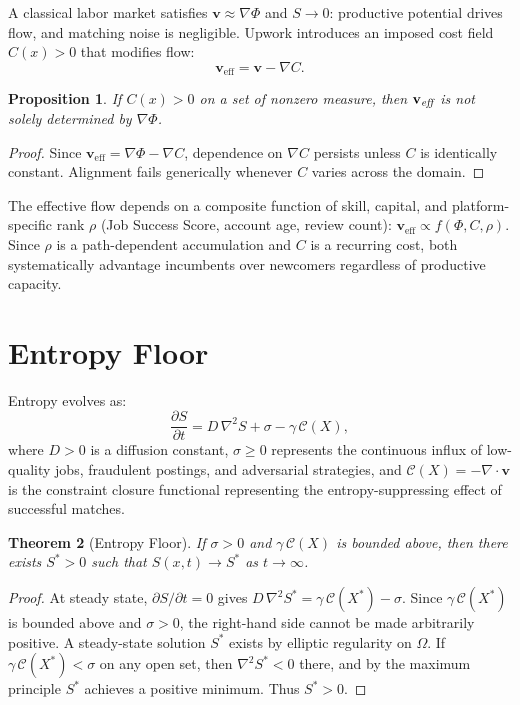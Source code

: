 \documentclass[11pt]{article}
\newtheorem{theorem}{Theorem}
\newtheorem{proposition}[theorem]{Proposition}
\begin{document}
A classical labor market satisfies $\mathbf{v} \approx \nabla\Phi$ and
$S \to 0$: productive potential drives flow, and matching noise is
negligible. Upwork introduces an imposed cost field $C(x) > 0$ that
modifies flow:
\[
\mathbf{v}_{\text{eff}} = \mathbf{v} - \nabla C.
\]

\begin{proposition}
If $C(x) > 0$ on a set of nonzero measure, then $\mathbf{v}_{\emph{eff}}$
is not solely determined by $\nabla\Phi$.
\end{proposition}

\begin{proof}
Since $\mathbf{v}_{\text{eff}} = \nabla\Phi - \nabla C$, dependence on
$\nabla C$ persists unless $C$ is identically constant. Alignment fails
generically whenever $C$ varies across the domain.
\end{proof}

The effective flow depends on a composite function of skill, capital, and
platform-specific rank $\rho$ (Job Success Score, account age, review count):
$\mathbf{v}_{\text{eff}} \propto f(\Phi, C, \rho)$. Since $\rho$ is a
path-dependent accumulation and $C$ is a recurring cost, both systematically
advantage incumbents over newcomers regardless of productive capacity.

\section{Entropy Floor}
\label{sec:entropy}

Entropy evolves as:
\[
\frac{\partial S}{\partial t} = D\,\nabla^2 S + \sigma - \gamma\,\mathcal{C}(X),
\]
where $D > 0$ is a diffusion constant, $\sigma \geq 0$ represents the
continuous influx of low-quality jobs, fraudulent postings, and adversarial
strategies, and $\mathcal{C}(X) = -\nabla \cdot \mathbf{v}$ is the
constraint closure functional representing the entropy-suppressing effect of
successful matches.

\begin{theorem}[Entropy Floor]
If $\sigma > 0$ and $\gamma\,\mathcal{C}(X)$ is bounded above, then there
exists $S^* > 0$ such that $S(x,t) \to S^*$ as $t \to \infty$.
\end{theorem}

\begin{proof}
At steady state, $\partial S/\partial t = 0$ gives
$D\,\nabla^2 S^* = \gamma\,\mathcal{C}(X^*) - \sigma$.
Since $\gamma\,\mathcal{C}(X^*)$ is bounded above and $\sigma > 0$, the
right-hand side cannot be made arbitrarily positive. A steady-state solution
$S^*$ exists by elliptic regularity on $\Omega$. If $\gamma\,\mathcal{C}(X^*)
< \sigma$ on any open set, then $\nabla^2 S^* < 0$ there, and by the maximum
principle $S^*$ achieves a positive minimum. Thus $S^* > 0$.
\end{proof}
\end{document}
